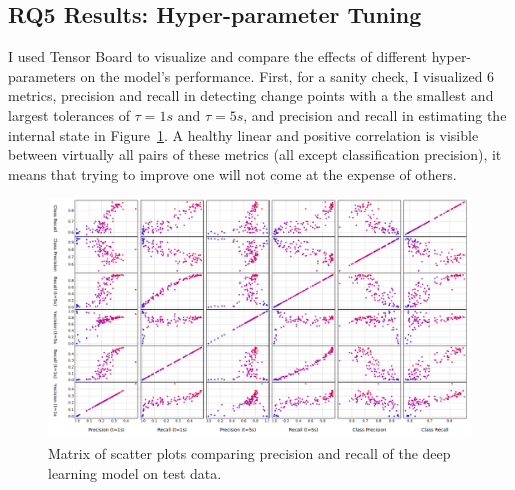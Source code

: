 \subsection{RQ5 Results: Hyper-parameter Tuning}
I used Tensor Board to visualize and compare the effects of different hyper-parameters on the model's performance. First, for a sanity check, I visualized 6 metrics, precision and recall in detecting change points with a the smallest and largest tolerances of $\tau=1s$ and $\tau=5s$, and precision and recall in estimating the internal state in Figure~\ref{fig:precision_recall_matrix}. A healthy linear and positive correlation is visible between virtually all pairs of these metrics (all except classification precision), it means that trying to improve one will not come at the expense of others. 
\begin{figure}
    \centering
    \includegraphics[width=\columnwidth]{RQ3-5_charts/prec_recall_matrix_tuning_white_background.png}
    \caption{Matrix of scatter plots comparing precision and recall of the deep learning model on test data.}
    \label{fig:precision_recall_matrix}
\end{figure}

